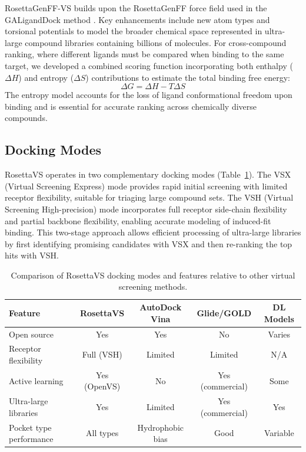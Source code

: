 \documentclass[12pt]{article}
\begin{document}
RosettaGenFF-VS builds upon the RosettaGenFF force field used in the GALigandDock method \citep{park2021}. Key enhancements include new atom types and torsional potentials to model the broader chemical space represented in ultra-large compound libraries containing billions of molecules. For cross-compound ranking, where different ligands must be compared when binding to the same target, we developed a combined scoring function incorporating both enthalpy ($\Delta H$) and entropy ($\Delta S$) contributions to estimate the total binding free energy:
\begin{equation}
\Delta G = \Delta H - T\Delta S
\end{equation}
The entropy model accounts for the loss of ligand conformational freedom upon binding and is essential for accurate ranking across chemically diverse compounds.

\subsection{Docking Modes}

RosettaVS operates in two complementary docking modes (Table~\ref{tab:docking_modes}). The VSX (Virtual Screening Express) mode provides rapid initial screening with limited receptor flexibility, suitable for triaging large compound sets. The VSH (Virtual Screening High-precision) mode incorporates full receptor side-chain flexibility and partial backbone flexibility, enabling accurate modeling of induced-fit binding. This two-stage approach allows efficient processing of ultra-large libraries by first identifying promising candidates with VSX and then re-ranking the top hits with VSH.

\begin{table}[ht]
\centering
\caption{Comparison of RosettaVS docking modes and features relative to other virtual screening methods.}
\label{tab:docking_modes}
\begin{tabular}{lcccc}
\toprule
\textbf{Feature} & \textbf{RosettaVS} & \textbf{AutoDock Vina} & \textbf{Glide/GOLD} & \textbf{DL Models} \\
\midrule
Open source & Yes & Yes & No & Varies \\
Receptor flexibility & Full (VSH) & Limited & Limited & N/A \\
Active learning & Yes (OpenVS) & No & Yes (commercial) & Some \\
Ultra-large libraries & Yes & Limited & Yes (commercial) & Yes \\
Pocket type performance & All types & Hydrophobic bias & Good & Variable \\
\bottomrule
\end{tabular}
\end{table}
\end{document}
